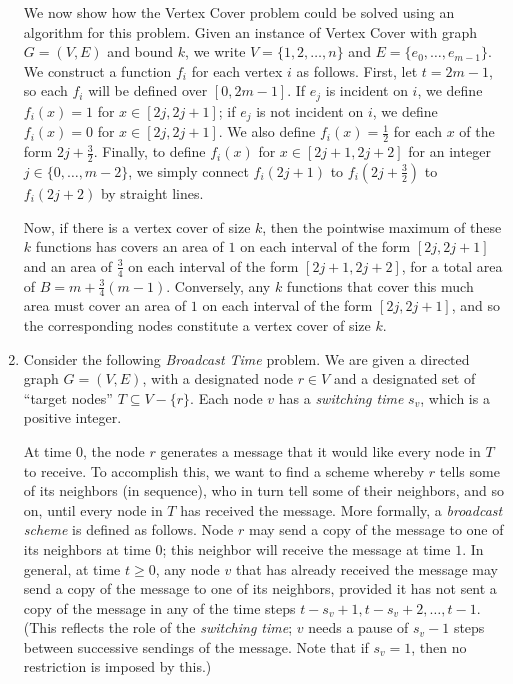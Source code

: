 \documentclass[12pt]{article}
\begin{document}
\begin{enumerate}
{We now show how the Vertex Cover problem could be
solved using an algorithm for this problem.
Given an instance of Vertex Cover with graph $G = (V,E)$
and bound $k$, we write $V = \{1, 2, \ldots, n\}$ and
$E = \{e_0, \ldots, e_{m-1}\}$.
We construct a function $f_i$ for each vertex $i$ as follows.
First, let $t = 2m-1$, so each $f_i$ will be defined over $[0,2m-1]$.
If $e_j$ is incident on $i$, we define
$f_i(x) = 1$ for $x \in [2j, 2j+1]$;
if $e_j$ is not incident on $i$, we define
$f_i(x) = 0$ for $x \in [2j, 2j+1]$.
We also define $f_i(x) = \frac12$ for each $x$
of the form $2j + \frac32$.
Finally, to define $f_i(x)$ for $x \in [2j + 1, 2j + 2]$
for an integer $j \in \{0, \ldots, m-2\}$,
we simply connect $f_i(2j+1)$ to
$f_i(2j + \frac32)$ to $f_i(2j + 2)$ by straight lines.

Now, if there is a vertex cover of size $k$, then
the pointwise maximum of these $k$ functions
has covers an area of $1$ on each interval of the form
$[2j, 2j + 1]$ and an area of $\frac34$ on each
interval of the form $[2j + 1, 2j + 2]$,
for a total area of $B = m + \frac34(m-1)$.
Conversely, any $k$ functions that cover this much area
must cover an area of $1$ on each interval of the form
$[2j, 2j + 1]$, and so the corresponding nodes constitute a vertex
cover of size $k$.

}


\item

Consider the following {\em Broadcast Time} problem.
We are given a directed graph $G = (V,E)$, with a designated node $r \in V$
and a designated set of ``target nodes'' $T \subseteq V - \{r\}$.
Each node $v$ has a {\em switching time} $s_v$, which is a positive integer.

At time $0$, the node $r$ generates a message that it would
like every node in $T$ to receive.
To accomplish this, we want to find a scheme whereby
$r$ tells some of its neighbors (in sequence), who in turn
tell some of their neighbors, and so on, until every node in $T$
has received the message.
More formally, a {\em broadcast scheme} is defined as follows.
Node $r$ may send a copy of the message to one of its
neighbors at time $0$; this neighbor will receive the message at time $1$.
In general, at time $t \geq 0$,
any node $v$ that has already received the message
may send a copy of the message to one of its neighbors, provided it has
not sent a copy of the message in any of the time steps
$t - s_v + 1, t - s_v + 2, \ldots, t - 1$.
(This reflects the role of the {\em switching time};
$v$ needs a pause of $s_v - 1$ steps between successive
sendings of the message.
Note that if $s_v = 1$, then no restriction is imposed by this.)


\end{enumerate}
\end{document}
